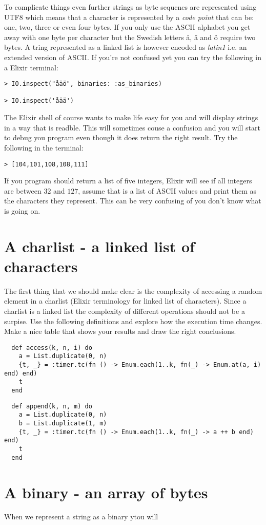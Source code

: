 \documentclass[a4paper,11pt]{article}
\begin{document}
To complicate things even further strings as byte sequcnes are
represented using UTF8 which means that a character is represented by
a {\em code point} that can be: one, two, three or even four bytes. If
you only use the ASCII alphabet you get away with one byte per
character but the Swedish letters å, ä and ö require two bytes. A
tring represented as a linked list is however encoded as {\em latin1}
i.e. an extended version of ASCII. If you're not confused yet you can
try the following in a Elixir terminal:

\begin{verbatim}
> IO.inspect("åäö", binaries: :as_binaries)

> IO.inspect('åää')

\end{verbatim}

The Elixir shell of course wants to make life easy for you and will
display strings in a way that is readble. This will sometimes couse a
confusion and you will start to debug you program even though it does
return the right result. Try the following in the terminal:

\begin{verbatim}
> [104,101,108,108,111]

\end{verbatim}

If you program should return a list of five integers, Elixir will see
if all integers are between $32$ and $127$, assume that is a list of
ASCII values and print them as the characters they represent. This can
be very confusing of you don't know what is going on.


\section{A charlist - a linked list of characters}

The first thing that we should make clear is the complexity of
accessing a random element in a charlist (Elixir terminology for
linked list of characters). Since a charlist is a linked list the
complexity of different operations should not be a surpise. Use the
following definitions and explore how the execution time changes. Make
a nice table that shows your results and draw the right conclusions. 


\begin{verbatim}
  def access(k, n, i) do
    a = List.duplicate(0, n)
    {t, _} = :timer.tc(fn () -> Enum.each(1..k, fn(_) -> Enum.at(a, i) end) end)
    t
  end
\end{verbatim}


\begin{verbatim}
  def append(k, n, m) do
    a = List.duplicate(0, n)
    b = List.duplicate(1, m)
    {t, _} = :timer.tc(fn () -> Enum.each(1..k, fn(_) -> a ++ b end) end)
    t
  end
\end{verbatim}
  

\section{A binary - an array of bytes}

When we represent a string as a binary ytou will 
\end{document}
